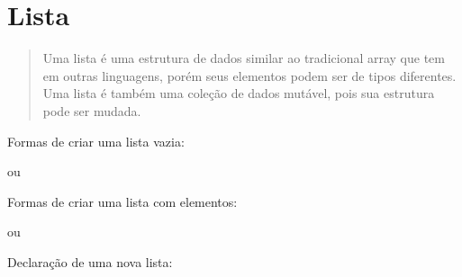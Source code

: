 \documentclass[letterpaper,10pt,brazil]{sphinxmanual}
\begin{document}
\chapter{Lista}
\label{\detokenize{content/list:lista}}\label{\detokenize{content/list::doc}}\begin{quote}

Uma lista é uma estrutura de dados similar ao tradicional array que tem em
outras linguagens, porém seus elementos podem ser de tipos diferentes.
Uma lista é também uma coleção de dados mutável, pois sua estrutura pode ser mudada.
\end{quote}

Formas de criar uma lista vazia:

\begin{sphinxVerbatim}[commandchars=\\\{\}]
  \PYG{p}{[}\PYG{p}{]}
\end{sphinxVerbatim}

ou

\begin{sphinxVerbatim}[commandchars=\\\{\}]
  
\end{sphinxVerbatim}

Formas de criar uma lista com elementos:

\begin{sphinxVerbatim}[commandchars=\\\{\}]
  \PYG{p}{[}  \PYG{p}{]}
\end{sphinxVerbatim}

ou

\begin{sphinxVerbatim}[commandchars=\\\{\}]
  \PYG{p}{[}  \PYG{p}{]}
\end{sphinxVerbatim}

Declaração de uma nova lista:

\begin{sphinxVerbatim}[commandchars=\\\{\}]
  \PYG{p}{[}   \PYG{p}{]}
\end{sphinxVerbatim}
\end{document}
